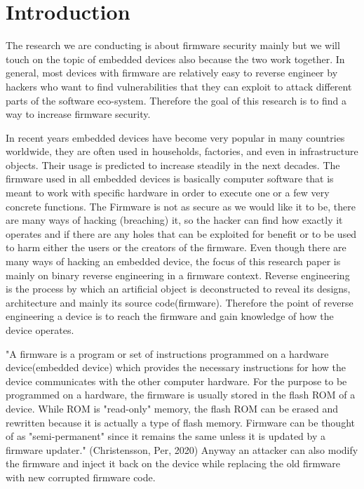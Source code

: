 \documentclass[]{report}
\begin{document}
\section{Introduction}
\begin{center}

The research we are conducting is about firmware security mainly but we will touch on the topic of embedded devices also because the two work together. In general, most devices with firmware are relatively easy to reverse engineer by hackers who want to find vulnerabilities that they can exploit to attack different parts of the software eco-system. Therefore the goal of this research is to find a way to increase firmware security.

In recent years embedded devices have become very popular in many countries worldwide, they are often used in households, factories, and even in infrastructure objects. Their usage is predicted to increase steadily in the next decades. The firmware used in all embedded devices is basically computer software that is meant to work with specific hardware in order to execute one or a few very concrete functions. The Firmware is not as secure as we would like it to be, there are many ways of hacking (breaching) it, so the hacker can find how exactly it operates and if there are any holes that can be exploited for benefit or to be used to harm either the users or the creators of the firmware. Even though there are many ways of hacking an embedded device, the focus of this research paper is mainly on binary reverse engineering in a firmware context. Reverse engineering is the process by which an artificial object is deconstructed to reveal its designs, architecture and mainly its source code(firmware). Therefore the point of reverse engineering a device is to reach the firmware and gain knowledge of how the device operates.

"A firmware is a program or set of instructions programmed on a hardware device(embedded device) which provides the necessary instructions for how the device communicates with the other computer hardware. For the purpose to be programmed on a hardware, the firmware is usually stored in the flash ROM of a device. While ROM is "read-only" memory, the flash ROM can be erased and rewritten because it is actually a type of flash memory. Firmware can be thought of as "semi-permanent" since it remains the same unless it is updated by a firmware updater." (Christensson, Per, 2020) Anyway an attacker can also modify the firmware and inject it back on the device while replacing the old firmware with new corrupted firmware code.


\end{center}
\end{document}
